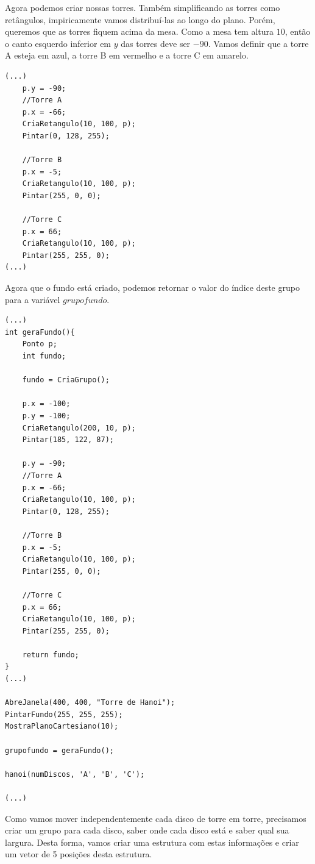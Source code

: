 Agora podemos criar nossas torres. Também simplificando as torres como retângulos, impiricamente vamos distribuí-las ao longo do plano. Porém, queremos que as torres fiquem acima da mesa. Como a mesa tem altura $10$, então o canto esquerdo inferior em $y$ das torres deve ser $-90$.
Vamos definir que a torre A esteja em azul, a torre B em vermelho e a torre C em amarelo.

%
 \begin{lstlisting}[caption={Torres.}, style=tuto] 
 (...)
    p.y = -90;
    //Torre A
    p.x = -66;
    CriaRetangulo(10, 100, p);
    Pintar(0, 128, 255);

    //Torre B
    p.x = -5;
    CriaRetangulo(10, 100, p);
    Pintar(255, 0, 0);

    //Torre C
    p.x = 66;
    CriaRetangulo(10, 100, p);
    Pintar(255, 255, 0);
(...)
\end{lstlisting}

Agora que o fundo está criado, podemos retornar o valor do índice deste grupo para a variável $grupofundo$.

 \begin{lstlisting}[caption={Função \emph{geraFundo}.}, style=tuto] 
 (...)
int geraFundo(){
    Ponto p;
    int fundo;

    fundo = CriaGrupo();

    p.x = -100;
    p.y = -100;
    CriaRetangulo(200, 10, p);
    Pintar(185, 122, 87);

    p.y = -90;
    //Torre A
    p.x = -66;
    CriaRetangulo(10, 100, p);
    Pintar(0, 128, 255);

    //Torre B
    p.x = -5;
    CriaRetangulo(10, 100, p);
    Pintar(255, 0, 0);

    //Torre C
    p.x = 66;
    CriaRetangulo(10, 100, p);
    Pintar(255, 255, 0);

    return fundo;
}
(...)

AbreJanela(400, 400, "Torre de Hanoi");
PintarFundo(255, 255, 255);
MostraPlanoCartesiano(10);

grupofundo = geraFundo();

hanoi(numDiscos, 'A', 'B', 'C');

(...)
\end{lstlisting}

Como vamos mover independentemente cada disco de torre em torre, precisamos criar um grupo para cada disco, saber onde cada disco está e saber qual sua largura. Desta forma, vamos criar uma estrutura com estas informações e criar um vetor de 5 posições desta estrutura.

